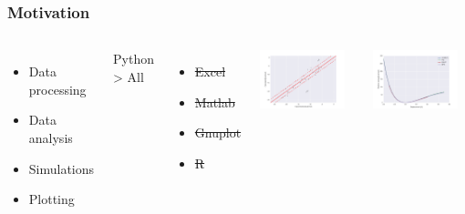 \documentclass{beamer}
\begin{document}
\begin{frame}[fragile]

    \frametitle{Motivation}

    \begin{columns}[t]


            \begin{itemize}
                \item Data processing
                \item Data analysis
                \item Simulations
                \item Plotting
            \end{itemize}

            \bigskip

            Python > All
            \begin{itemize}
                \item \st{Excel}
                \item \st{Matlab}
                \item \st{Gnuplot}
                \item \st{R}
            \end{itemize}


            \includegraphics[width=0.9\textwidth]{images/plot1.png}

            \includegraphics[width=0.9\textwidth]{images/plot2.png}


\end{columns}
\end{frame}
\end{document}
